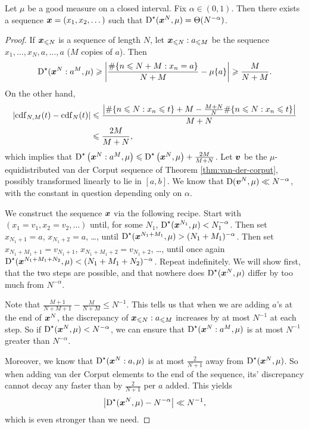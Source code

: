\begin{theorem}\label{thm:discrepancy-arbitrary}
Let $\mu$ be a good measure on a closed interval. Fix $\alpha\in (0,1)$. 
Then there exists a sequence ${\boldsymbol x}=(x_1,x_2,\dots)$ such that 
$\operatorname{D}^\star({\boldsymbol x}^N,\mu) = \Theta(N^{-\alpha})$. 
\end{theorem}
\begin{proof}
If ${\boldsymbol x}_{\leqslant N}$ is a sequence of length $N$, let 
${\boldsymbol x}_{\leqslant N}:a_{\leqslant M}$ be the sequence $x_1,\dots,x_N,a,\dots,a$ 
($M$ copies of $a$). Then 
\[
	\operatorname{D}^\star({\boldsymbol x}^N:a^M,\mu)
		\geqslant \left| \frac{\#\{ n\leqslant N+M : x_n = a\}}{N+M} - \mu\{a\}\right| 
		\geqslant \frac{M}{N+M} .
\]
On the other hand, 
\begin{align*}
	\left| \operatorname{cdf}_{N,M}(t) - \operatorname{cdf}_N(t)\right| 
		&\leqslant \frac{\left|\#\{n\leqslant N : x_n\leqslant t\} + M - \frac{M+N}{N}\#\{n\leqslant N : x_n\leqslant t\}\right|}{M+N} \\
		&\leqslant \frac{2M}{M+N} ,
\end{align*}
which implies that 
$\operatorname{D}^\star\left({\boldsymbol x}^N:a^M,\mu\right) \leqslant \operatorname{D}^\star\left({\boldsymbol x}^N,\mu\right) + \frac{2 M}{M+N}$. 
Let ${\boldsymbol v}$ be the $\mu$-equidistributed van der Corput sequence of 
Theorem \ref{thm:van-der-corput}, possibly transformed linearly to lie in 
$[a,b]$. We know that $\operatorname{D}({\boldsymbol v}^N, \mu) \ll N^{-\alpha}$, with the constant 
in question depending only on $\alpha$. 

We construct the sequence ${\boldsymbol x}$ via the following recipe. Start with 
$(x_1 = v_1,x_2 = v_2,\dots)$ until, for some $N_1$, 
$\operatorname{D}^\star({\boldsymbol x}^{N_1},\mu) < N_1^{-\alpha}$. Then set $x_{N_1+1} = a$, 
$x_{N_1+2} = a$, \dots, until 
$\operatorname{D}^\star({\boldsymbol x}^{N_1+M_1},\mu) > (N_1+M_1)^{-\alpha}$. Then set 
$x_{N_1+M_1+1} = v_{N_1+1}$, $x_{N_1+M_1+2} = v_{N_1+2}$, \dots, 
until once again 
$\operatorname{D}^\star({\boldsymbol x}^{N_1+M_1+N_2},\mu) < (N_1+M_1+N_2)^{-\alpha}$. Repeat 
indefinitely. We will show first, that the two steps are possible, and that 
nowhere does $\operatorname{D}^\star({\boldsymbol x}^N,\mu)$ differ by too much from 
$N^{-\alpha}$. 

Note that $\frac{M+1}{N+M+1} - \frac{M}{N+M} \leqslant N^{-1}$. This tells 
us that when we are adding $a$'s at the end of ${\boldsymbol x}^N$, the discrepancy of 
${\boldsymbol x}_{\leqslant N}:a_{\leqslant M}$ increases by at most $N^{-1}$ at each 
step. So if $\operatorname{D}^\star({\boldsymbol x}^N,\mu) < N^{-\alpha}$, we can ensure that 
$\operatorname{D}^\star({\boldsymbol x}^N:a^M,\mu)$ is at most $N^{-1}$ greater than $N^{-\alpha}$. 

Moreover, we know that $\operatorname{D}^\star({\boldsymbol x}^N:a,\mu)$ is at most 
$\frac{2}{N+1}$ away from $\operatorname{D}^\star({\boldsymbol x}^N,\mu)$. So when adding van der 
Corput elements to the end of the sequence, its' discrepancy cannot decay any 
faster than by $\frac{2}{N+1}$ per $a$ added. This yields 
\[
	\left|\operatorname{D}^\star({\boldsymbol x}^N,\mu) - N^{-\alpha}\right| \ll N^{-1} , 
\]
which is even stronger than we need.
\end{proof}






